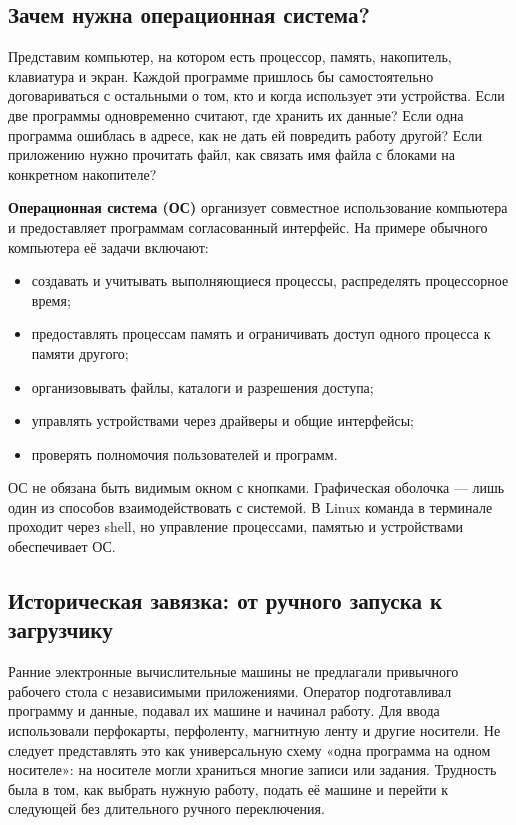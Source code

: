 \subsection{Зачем нужна операционная система?}

Представим компьютер, на котором есть процессор, память, накопитель,
клавиатура и экран. Каждой программе пришлось бы самостоятельно договариваться
с остальными о том, кто и когда использует эти устройства. Если две программы
одновременно считают, где хранить их данные? Если одна программа ошиблась в
адресе, как не дать ей повредить работу другой? Если приложению нужно прочитать
файл, как связать имя файла с блоками на конкретном накопителе?

\textbf{Операционная система (ОС)} организует совместное использование
компьютера и предоставляет программам согласованный интерфейс. На примере
обычного компьютера её задачи включают:
\begin{itemize}
  \item создавать и учитывать выполняющиеся процессы, распределять процессорное
        время;
  \item предоставлять процессам память и ограничивать доступ одного процесса
        к памяти другого;
  \item организовывать файлы, каталоги и разрешения доступа;
  \item управлять устройствами через драйверы и общие интерфейсы;
  \item проверять полномочия пользователей и программ.
\end{itemize}

ОС не обязана быть видимым окном с кнопками. Графическая оболочка --- лишь один
из способов взаимодействовать с системой. В Linux команда в терминале проходит
через shell, но управление процессами, памятью и устройствами обеспечивает ОС.

\subsection{Историческая завязка: от ручного запуска к загрузчику}

Ранние электронные вычислительные машины не предлагали привычного рабочего
стола с независимыми приложениями. Оператор подготавливал программу и данные,
подавал их машине и начинал работу. Для ввода использовали перфокарты,
перфоленту, магнитную ленту и другие носители. Не следует представлять это как
универсальную схему «одна программа на одном носителе»: на носителе могли
храниться многие записи или задания. Трудность была в том, как выбрать нужную
работу, подать её машине и перейти к следующей без длительного ручного
переключения.

